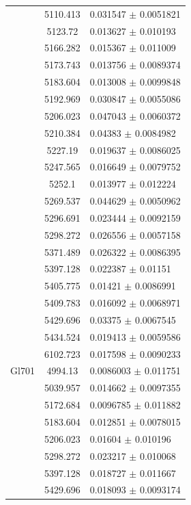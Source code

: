 \begin{longtable}{|c|c|l|}
 & 5110.413 & 0.031547 $\pm$ 0.0051821 \\       
 & 5123.72 & 0.013627 $\pm$ 0.010193 \\         
 & 5166.282 & 0.015367 $\pm$ 0.011009 \\        
 & 5173.743 & 0.013756 $\pm$ 0.0089374 \\       
 & 5183.604 & 0.013008 $\pm$ 0.0099848 \\       
 & 5192.969 & 0.030847 $\pm$ 0.0055086 \\       
 & 5206.023 & 0.047043 $\pm$ 0.0060372 \\       
 & 5210.384 & 0.04383 $\pm$ 0.0084982 \\        
 & 5227.19 & 0.019637 $\pm$ 0.0086025 \\        
 & 5247.565 & 0.016649 $\pm$ 0.0079752 \\       
 & 5252.1 & 0.013977 $\pm$ 0.012224 \\          
 & 5269.537 & 0.044629 $\pm$ 0.0050962 \\       
 & 5296.691 & 0.023444 $\pm$ 0.0092159 \\       
 & 5298.272 & 0.026556 $\pm$ 0.0057158 \\       
 & 5371.489 & 0.026322 $\pm$ 0.0086395 \\       
 & 5397.128 & 0.022387 $\pm$ 0.01151 \\         
 & 5405.775 & 0.01421 $\pm$ 0.0086991 \\        
 & 5409.783 & 0.016092 $\pm$ 0.0068971 \\       
 & 5429.696 & 0.03375 $\pm$ 0.0067545 \\        
 & 5434.524 & 0.019413 $\pm$ 0.0059586 \\       
 & 6102.723 & 0.017598 $\pm$ 0.0090233 \\       
\hline                                          
Gl701 & 4994.13 & 0.0086003 $\pm$ 0.011751 \\   
 & 5039.957 & 0.014662 $\pm$ 0.0097355 \\       
 & 5172.684 & 0.0096785 $\pm$ 0.011882 \\       
 & 5183.604 & 0.012851 $\pm$ 0.0078015 \\       
 & 5206.023 & 0.01604 $\pm$ 0.010196 \\         
 & 5298.272 & 0.023217 $\pm$ 0.010068 \\        
 & 5397.128 & 0.018727 $\pm$ 0.011667 \\        
 & 5429.696 & 0.018093 $\pm$ 0.0093174 \\       

\end{longtable}
